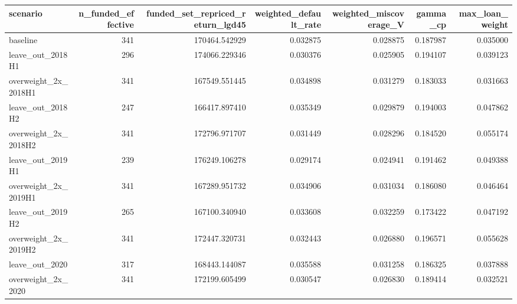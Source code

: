 \begin{tabular}{lrrrrrr}
\toprule
scenario & n\_funded\_effective & funded\_set\_repriced\_return\_lgd45 & weighted\_default\_rate & weighted\_miscoverage\_V & gamma\_cp & max\_loan\_weight \\
\midrule
baseline & 341 & 170464.542929 & 0.032875 & 0.028875 & 0.187987 & 0.035000 \\
leave\_out\_2018H1 & 296 & 174066.229346 & 0.030376 & 0.025905 & 0.194107 & 0.039123 \\
overweight\_2x\_2018H1 & 341 & 167549.551445 & 0.034898 & 0.031279 & 0.183033 & 0.031663 \\
leave\_out\_2018H2 & 247 & 166417.897410 & 0.035349 & 0.029879 & 0.194003 & 0.047862 \\
overweight\_2x\_2018H2 & 341 & 172796.971707 & 0.031449 & 0.028296 & 0.184520 & 0.055174 \\
leave\_out\_2019H1 & 239 & 176249.106278 & 0.029174 & 0.024941 & 0.191462 & 0.049388 \\
overweight\_2x\_2019H1 & 341 & 167289.951732 & 0.034906 & 0.031034 & 0.186080 & 0.046464 \\
leave\_out\_2019H2 & 265 & 167100.340940 & 0.033608 & 0.032259 & 0.173422 & 0.047192 \\
overweight\_2x\_2019H2 & 341 & 172447.320731 & 0.032443 & 0.026880 & 0.196571 & 0.055628 \\
leave\_out\_2020 & 317 & 168443.144087 & 0.035588 & 0.031258 & 0.186325 & 0.037888 \\
overweight\_2x\_2020 & 341 & 172199.605499 & 0.030547 & 0.026830 & 0.189414 & 0.032521 \\
\bottomrule
\end{tabular}
